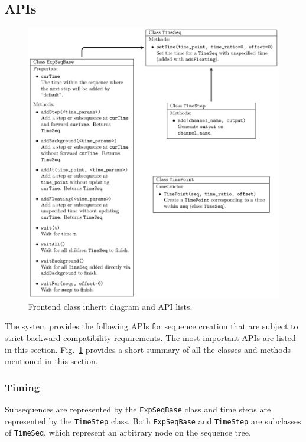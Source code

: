 \subsection{APIs}
\begin{figure}
  \centering
  \includegraphics[width=\textwidth]{figures/computer_control_frontend_classes.pdf}
  \caption[Frontend API classes]{
    Frontend class inherit diagram and API lists.
    \label{fig:computer-control:frontend-classes}}
\end{figure}

The system provides the following APIs for sequence creation
that are subject to strict backward compatibility requirements.
The most important APIs are listed in this section.
Fig.~\ref{fig:computer-control:frontend-classes}
provides a short summary of all the classes and methods mentioned in this section.

\subsubsection{Timing}
Subsequences are represented by the \verb`ExpSeqBase` class
and time steps are represented by the \verb`TimeStep` class.
Both \verb`ExpSeqBase` and \verb`TimeStep` are subclasses of \verb`TimeSeq`,
which represent an arbitrary node on the sequence tree.

